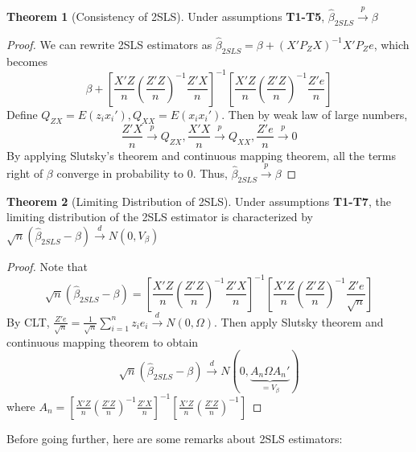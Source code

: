 \documentclass[12pt]{article}
\theoremstyle{definition}
\theoremstyle{property}
\theoremstyle{assumption}
\theoremstyle{example}
\theoremstyle{comment}
\newtheorem{theorem}{Theorem}[section]
\begin{document}
\begin{mdframed}[backgroundcolor=green!5] 
\begin{theorem}[Consistency of 2SLS] Under assumptions \textbf{T1-T5}, $\hat{\beta}_{2SLS}\xrightarrow{p}\beta$
\begin{proof}
We can rewrite 2SLS estimators as $\hat{\beta}_{2SLS}=\beta+(X'P_ZX)^{-1}X'P_Ze$, which becomes
\small{\[
\beta+\left[\frac{X'Z}{n}\left(\frac{Z'Z}{n}\right)^{-1} \frac{Z'X}{n}\right]^{-1}\left[\frac{X'Z}{n}\left(\frac{Z'Z}{n}\right)^{-1} \frac{Z'e}{n}\right]
\]}\normalsize
Define $Q_{ZX}=E(z_ix_i'), Q_{XX}=E(x_ix_i')$. Then by weak law of large numbers,
\small{\[
\frac{Z'X}{n}\xrightarrow{p}Q_{ZX}, \frac{X'X}{n}\xrightarrow{p}Q_{XX}, \frac{Z'e}{n}\xrightarrow{p}0
\]}\normalsize
By applying Slutsky's theorem and continuous mapping theorem, all the terms right of $\beta$ converge in probability to 0. Thus, $\hat{\beta}_{2SLS}\xrightarrow{p}\beta$
\end{proof}
\end{theorem}
\begin{theorem}[Limiting Distribution of 2SLS] Under assumptions \textbf{T1-T7}, the limiting distribution of the 2SLS estimator is characterized by $\sqrt{n}(\hat{\beta}_{2SLS}-\beta)\xrightarrow{d}N(0,V_\beta)$
\begin{proof}
Note that
\small{\[
\sqrt{n}(\hat{\beta}_{2SLS}-\beta)=\left[\frac{X'Z}{n}\left(\frac{Z'Z}{n}\right)^{-1} \frac{Z'X}{n}\right]^{-1}\left[\frac{X'Z}{n}\left(\frac{Z'Z}{n}\right)^{-1} \frac{Z'e}{\sqrt{n}}\right]
\]}\normalsize
By CLT, $\frac{Z'e}{\sqrt{n}}=\frac{1}{\sqrt{n}}\sum_{i=1}^nz_ie_i\xrightarrow{d}N(0,\Omega)$. Then apply Slutsky theorem and continuous mapping theorem to obtain
\small{\[
\sqrt{n}(\hat{\beta}_{2SLS}-\beta)\xrightarrow{d}N(0,\underbrace{A_n\Omega A_n'}_{=V_\beta})
\]}\normalsize
where $A_n=\left[\frac{X'Z}{n}\left(\frac{Z'Z}{n}\right)^{-1} \frac{Z'X}{n}\right]^{-1}\left[ \frac{X'Z}{n}\left(\frac{Z'Z}{n}\right)^{-1}\right]$
\end{proof}
\end{theorem}
\end{mdframed}
Before going further, here are some remarks about 2SLS estimators:
\end{document}
